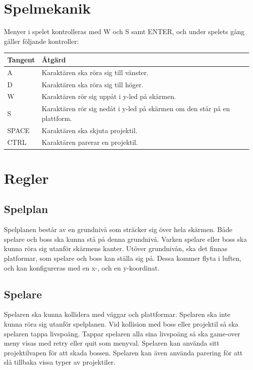\documentclass{TDP005mall}
\begin{document}
\section{Spelmekanik}
Menyer i spelet kontrolleras med W och S samt ENTER, och under spelets gång gäller följande kontroller:
\begin{table}[H]
\begin{tabularx}{\linewidth}{|l|p{14.39cm}|}
\hline
Tangent & Åtgärd \\\hline
A & Karaktären ska röra sig till vänster. \\\hline
D & Karaktären ska röra sig till höger. \\\hline
W & Karaktären rör sig uppåt i y-led på skärmen. \\\hline
S & Karaktären rör sig nedåt i y-led på skärmen om den står på en plattform. \\\hline
SPACE & Karaktären ska skjuta projektil. \\\hline
CTRL & Karaktären parerar en projektil. \\\hline
\end{tabularx}
\end{table}

\section{Regler}
\subsection{Spelplan}
Spelplanen består av en grundnivå som sträcker sig över hela skärmen. Både spelare
och boss ska kunna stå på denna grundnivå. Varken spelare eller boss ska kunna
röra sig utanför skärmens kanter. Utöver grundnivån, ska det finnas platformar,
som spelare och boss kan ställa sig på. Dessa kommer flyta i luften, och kan konfigureras
med en x-, och en y-koordinat.

\subsection{Spelare}
Spelaren ska kunna kollidera med väggar och plattformar. Spelaren ska inte kunna
röra sig utanför spelplanen. Vid kollision med boss eller projektil så ska
spelaren tappa livspoäng. Tappar spelaren alla sina livspoäng så ska game-over
meny visas med retry eller quit som menyval. Spelaren kan använda sitt
projektilvapen för att skada bossen. Spelaren kan även använda parering för att slå
tillbaka vissa typer av projektiler.
\end{document}
